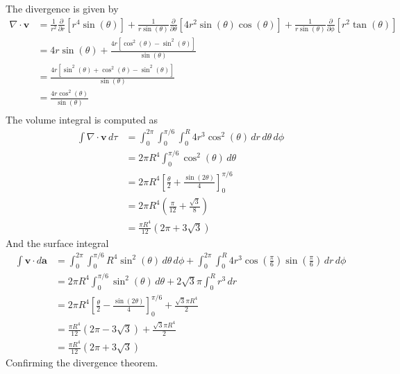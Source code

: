 \documentclass[a4paper]{article}
\begin{document}
The divergence is given by
\begin{align*}
      \nabla \cdot \pmb{v} & = \frac{1}{r^{2}}\frac{\partial }{\partial r}\!\left[ r^{4}\sin\!\left(\theta\right) \right] + \frac{1}{r \sin\!\left(\theta\right)}\frac{\partial }{\partial \theta}\!\left[ 4r^{2}\sin\!\left(\theta\right)\cos\!\left(\theta\right) \right] + \frac{1}{r \sin\!\left(\theta\right)}\frac{\partial }{\partial \phi}\!\left[ r^{2}\tan\!\left(\theta\right) \right] \\
       & = 4r \sin\!\left(\theta\right) + \frac{4r \!\left[ \cos^{2}\!\left(\theta\right) - \sin^{2}\!\left(\theta\right) \right]}{\sin\!\left(\theta\right)} \\
       & = \frac{4r \!\left[ \sin^{2}\!\left(\theta\right) + \cos^{2}\!\left(\theta\right) - \sin^{2}\!\left(\theta\right) \right]}{\sin\!\left(\theta\right)} \\
       & = \frac{4r \cos^{2}\!\left(\theta\right)}{\sin\!\left(\theta\right)} \\
\end{align*}
The volume integral is computed as 
\begin{align*}
      \int \nabla \cdot \pmb{v} \, d \tau & = \int^{2 \pi}_{0} \int^{\pi / 6}_{0} \int^{R}_{0} 4r^{3}\cos^{2}\!\left(\theta\right) \, dr \, d \theta \, d \phi \\
       & = 2 \pi R^{4} \int^{\pi / 6}_{0} \cos^{2}\!\left(\theta\right) \, d \theta \\
       & = 2 \pi R^{4} \!\left[ \frac{\theta}{2} + \frac{\sin\!\left(2 \theta\right)}{4} \right]^{\pi / 6}_{0} \\
       & = 2 \pi R^{4} \!\left( \frac{\pi}{12} + \frac{\sqrt{3}}{8} \right) \\
       & = \frac{\pi R^{4}}{12} \!\left( 2 \pi + 3 \sqrt{3} \right)
\end{align*}
And the surface integral
\begin{align*}
      \int \pmb{v} \cdot d \pmb{a} & = \int^{2 \pi}_{0} \int^{\pi / 6}_{0} R^{4}\sin^{2}\!\left(\theta\right) \, d \theta \, d \phi + \int^{2 \pi}_{0} \int^{R}_{0} 4r^{3}\cos\!\left(\frac{\pi}{6}\right)\sin\!\left(\frac{\pi}{6}\right) \, dr \, d \phi \\
       & = 2 \pi R^{4} \int^{\pi / 6}_{0} \sin^{2}\!\left(\theta\right) \, d \theta + 2 \sqrt{3} \pi\int^{R}_{0} r^{3} \, dr \\
       & = 2 \pi R^{4} \!\left[ \frac{\theta}{2} - \frac{\sin\!\left(2 \theta\right)}{4} \right]^{\pi / 6}_{0} + \frac{\sqrt{3} \pi R^{4}}{2} \\
       & = \frac{\pi R^{4}}{12} \!\left( 2 \pi - 3 \sqrt{3} \right) + \frac{\sqrt{3} \pi R^{4}}{2} \\
       & = \frac{\pi R^{4}}{12} \!\left( 2 \pi + 3 \sqrt{3} \right)
\end{align*}
Confirming the divergence theorem.
\end{document}
